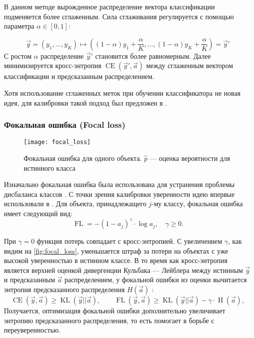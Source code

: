 \documentclass[12pt]{article}
\begin{document}
В данном методе вырожденное распределение вектора классификации подменяется более сглаженным. Сила сглаживания регулируется с помощью параметра $\alpha \in [0, 1]$:

\begin{equation}
    \vec{y}=\left(y_1,\dots,y_K\right)
    \mapsto
    \left(
        (1-\alpha)y_1 + \frac{\alpha}{K},
        \dots,
        (1-\alpha)y_K + \frac{\alpha}{K}
    \right)=\vec{y}'
\end{equation}
С ростом $\alpha$ распределение $\vec{y}'$ становится более равномерным. Далее минимизируется кросс-энтропия $\operatorname{CE}(\vec{y}',\vec{a})$ между сглаженным вектором классификации и предсказанным распределением.

Хотя использование сглаженных меток при обучении классификатора не новая идея, для калибровки такой подход был предложен в \cite{smoothing}.

\subsubsection{Фокальная ошибка (Focal loss)}

\begin{figure}[!h]
    \texttt{[image: focal\_loss]}
    \centering
    \caption{Фокальная ошибка для одного объекта. $\hat{p}$ --- оценка вероятности для истинного класса}
    \label{fig:focal_loss}
\end{figure}

Изначально фокальная ошибка была использована для устранения проблемы дисбаланса классов \cite{focal_detection}. С точки зрения калибровки уверенности идею впервые использовали в \cite{focal_calib}. Для объекта, принадлежащего $j$-му классу, фокальная ошибка имеет следующий вид:
\begin{equation}
    \operatorname{FL}=-(1-a_{j})^{\gamma}\cdot \log a_j, \quad \gamma \geqslant 0.
\end{equation}

При $\gamma=0$ функция потерь совпадает с кросс-энтропией. С увеличением $\gamma$, как видим на \autoref{fig:focal_loss}, уменьшается штраф за потери на объектах с уже высокой уверенностью в истинном классе. В то время как кросс-энтропия является верхней оценкой дивергенции Кульбака --- Лейблера между истинным $\vec{y}$ и предсказанным $\vec{a}$ распределением, у фокальной ошибки из оценки вычитается энтропия предсказанного распределения $H(\vec{a})$ \cite{focal_calib}:
\begin{equation*}
    \operatorname{CE}(\vec{y},\vec{a})
    \geqslant
    \operatorname{KL}(\vec{y}||\vec{a}),
    \qquad
    \operatorname{FL}(\vec{y},\vec{a})
    \geqslant
    \operatorname{KL}(\vec{y}||\vec{a})-\gamma\cdot \operatorname{H}(\vec{a}),
\end{equation*}
Получается, оптимизация фокальной ошибки дополнительно увеличивает энтропию предсказанного распределения, то есть помогает в борьбе с переуверенностью.
\end{document}
